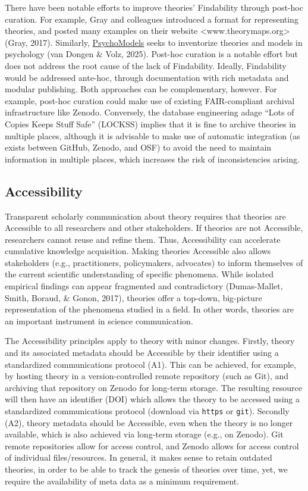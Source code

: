 \documentclass[
  man, noextraspace,floatsintext]{apa6}
\begin{document}
There have been notable efforts to improve theories' Findability through post-hoc curation.
For example, Gray and colleagues introduced a format for representing theories,
and posted many examples on their website \textless www.theorymaps.org\textgreater{} (Gray, 2017).
Similarly, \href{http://psychomodels.org/}{PsychoModels} seeks to inventorize theories and models in psychology (van Dongen \& Volz, 2025).
Post-hoc curation is a notable effort but does not address the root cause of the lack of Findability.
Ideally, Findability would be addressed ante-hoc, through documentation with rich metadata and modular publishing.
Both approaches can be complementary, however.
For example, post-hoc curation could make use of existing FAIR-compliant archival infrastructure like Zenodo.
Conversely, the database engineering adage ``Lots of Copies Keeps Stuff Safe'' (LOCKSS) implies that it is fine to archive theories in multiple places,
although it is advisable to make use of automatic integration (as exists between GitHub, Zenodo, and OSF) to avoid the need to maintain information in multiple places, which increases the risk of inconsistencies arising.

\subsection{Accessibility}\label{accessibility}

Transparent scholarly communication about theory requires that theories are Accessible to all researchers and other stakeholders.
If theories are not Accessible, researchers cannot reuse and refine them.
Thus, Accessibility can accelerate cumulative knowledge acquisition.
Making theories Accessible also allows stakeholders (e.g., practitioners, policymakers, advocates) to inform themselves of the current scientific understanding of specific phenomena.
While isolated empirical findings can appear fragmented and contradictory (Dumas-Mallet, Smith, Boraud, \& Gonon, 2017),
theories offer a top-down, big-picture representation of the phenomena studied in a field.
In other words, theories are an important instrument in science communication.

The Accessibility principles
apply to theory with minor changes.
Firstly, theory and its associated metadata should be Accessible by their identifier using a standardized communications protocol (A1).
This can be achieved, for example, by hosting theory in a version-controlled remote repository (such as Git), and archiving that repository on Zenodo for long-term storage.
The resulting resource will then have an identifier (DOI) which allows the theory to be accessed using a standardized communications protocol (download via \texttt{https} or \texttt{git}).
Secondly (A2), theory metadata should be Accessible, even when the theory is no longer available,
which is also achieved via long-term storage (e.g., on Zenodo).
Git remote repositories allow for access control,
and Zenodo allows for access control of individual files/resources.
In general, it makes sense to retain outdated theories, in order to be able to track the genesis of theories over time, yet, we require the availability of meta data as a minimum requirement.
\end{document}
